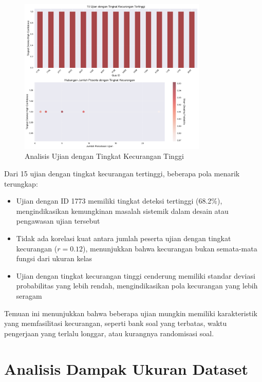 \begin{figure}[htbp]
    \centering
    \includegraphics[width=0.8\textwidth]{figures/quiz_analysis.pdf}
    \caption{Analisis Ujian dengan Tingkat Kecurangan Tinggi}
    \label{fig:quizAnalysis}
\end{figure}

Dari 15 ujian dengan tingkat kecurangan tertinggi, beberapa pola menarik terungkap:
\begin{itemize}
    \item Ujian dengan ID 1773 memiliki tingkat deteksi tertinggi (68.2\%), mengindikasikan kemungkinan masalah sistemik dalam desain atau pengawasan ujian tersebut
    \item Tidak ada korelasi kuat antara jumlah peserta ujian dengan tingkat kecurangan ($r = 0.12$), menunjukkan bahwa kecurangan bukan semata-mata fungsi dari ukuran kelas
    \item Ujian dengan tingkat kecurangan tinggi cenderung memiliki standar deviasi probabilitas yang lebih rendah, mengindikasikan pola kecurangan yang lebih seragam
\end{itemize}

Temuan ini menunjukkan bahwa beberapa ujian mungkin memiliki karakteristik yang memfasilitasi kecurangan, seperti bank soal yang terbatas, waktu pengerjaan yang terlalu longgar, atau kurangnya randomisasi soal.

\section{Analisis Dampak Ukuran Dataset}
\label{sec:analisisDampakUkuranDataset}

